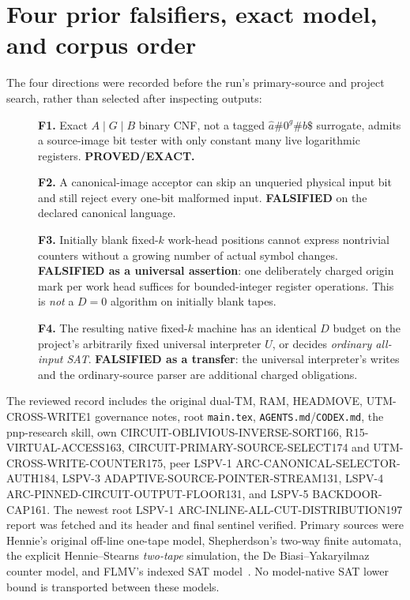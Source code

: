 \documentclass[11pt]{article}
\begin{document}
\section{Four prior falsifiers, exact model, and corpus order}
The four directions were recorded before the run's primary-source and
project search, rather than selected after inspecting outputs:
\begin{description}
\item[] \textbf{F1.} Exact $A\mid G\mid B$ binary CNF, not a tagged
$\hat a\#0^g\#b\$$ surrogate, admits a source-image bit tester
with only constant many live logarithmic registers. \textbf{PROVED/EXACT.}
\item[] \textbf{F2.} A canonical-image acceptor can skip an unqueried
physical input bit and still reject every one-bit malformed input.
\textbf{FALSIFIED} on the declared canonical language.
\item[] \textbf{F3.} Initially blank fixed-$k$ work-head positions
cannot express nontrivial counters without a growing number of
actual symbol changes. \textbf{FALSIFIED as a universal assertion}:
one deliberately charged origin mark per work head suffices for
bounded-integer register operations. This is \emph{not} a $D=0$
algorithm on initially blank tapes.
\item[] \textbf{F4.} The resulting native fixed-$k$ machine has an
identical $D$ budget on the project's arbitrarily fixed universal
interpreter $U$, or decides \emph{ordinary all-input SAT}.
\textbf{FALSIFIED as a transfer}: the universal interpreter's writes
and the ordinary-source parser are additional charged obligations.
\end{description}
The reviewed record includes the original dual-TM, RAM, HEADMOVE,
UTM-CROSS-WRITE1 governance notes, root \texttt{main.tex},
\texttt{AGENTS.md}/\texttt{CODEX.md}, the pnp-research skill, own
CIRCUIT-OBLIVIOUS-INVERSE-SORT166, R15-VIRTUAL-ACCESS163,
CIRCUIT-PRIMARY-SOURCE-SELECT174 and UTM-CROSS-WRITE-COUNTER175,
peer LSPV-1 ARC-CANONICAL-SELECTOR-AUTH184,
LSPV-3 ADAPTIVE-SOURCE-POINTER-STREAM131,
LSPV-4 ARC-PINNED-CIRCUIT-OUTPUT-FLOOR131, and
LSPV-5 BACKDOOR-CAP161. The newest root LSPV-1
ARC-INLINE-ALL-CUT-DISTRIBUTION197 report was fetched and its
header and final sentinel verified. Primary sources were
Hennie's original off-line one-tape model, Shepherdson's two-way
finite automata, the explicit Hennie--Stearns \emph{two-tape}
simulation, the De Biasi--Yakaryilmaz counter model,
and FLMV's indexed SAT model~\cite{hennie,twofa,hs,counter,flmv}.
No model-native SAT lower bound is transported between these models.
\end{document}
